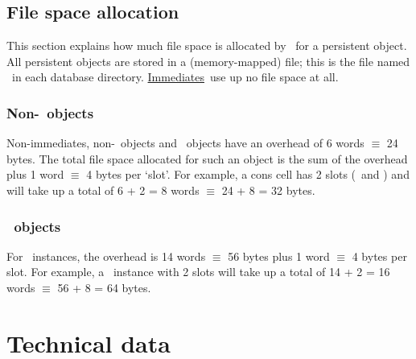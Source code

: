 \subsection{File space allocation}

This section explains how much file space is allocated by \plob\ for a
persistent object. All persistent objects are stored in a
(memory-mapped) file; this is the file named \ in
each database directory.  \hyperlink{link:Immediate}{Immediates}\ use
up no file space at all.

\subsubsection[Non-CLOS objects]{Non-\protect\clos\ objects}

Non-immediates, non-\clos\ objects and \ objects have
an overhead of 6 words $\equiv$ 24 bytes. The total file space
allocated for such an object is the sum of the overhead plus 1 word
$\equiv$ 4 bytes per `slot'. For example, a cons cell has 2 slots
(\ and ) and will take up a total of 6 + 2 = 8
words $\equiv$ 24 + 8 = 32 bytes.

\subsubsection[CLOS objects]{\protect\clos\ objects}

For \clos\ instances, the overhead is 14 words $\equiv$ 56 bytes plus
1 word $\equiv$ 4 bytes per slot. For example, a \clos\ instance with
2 slots will take up a total of 14 + 2 = 16 words $\equiv$ 56 + 8 = 64
bytes.

\section{Technical data}%
\label{sec:TechnicalData}



